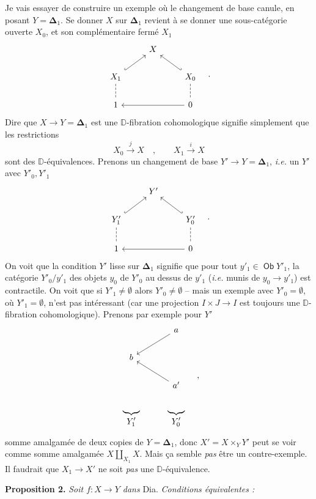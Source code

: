 \documentclass[11pt]{article}
\newcommand{\printedpage}[1]{\marginpar{\footnotesize p.~#1}}
\newcommand{\msp}[1]{\marginpar{\footnotesize [#1]}}
\newcommand{\D}{\mathbb{D}}
\newcommand{\Ob}{\mathop{\mathsf{Ob}}}
\newcommand{\Dia}{\textsf{Dia}}
\begin{document}
\hspace*{\parindent}Je vais essayer de construire un exemple où le changement de base canule, en posant $Y = \boldsymbol{\Delta}_1$. Se donner $X$ sur $\boldsymbol{\Delta}_1$ revient à se donner une sous-catégorie ouverte $X_0$, et son complémentaire fermé $X_1$
\[
\begin{tikzcd}
& X & \\
X_1 \arrow[ur, hook] \arrow[d, dash, dashed] & & X_0 \arrow[ul, hook'] \arrow[d, dash, dashed] \\
1 & & 0 \arrow[ll]
\end{tikzcd}
\quad .
\]
Dire que $X \to Y = \boldsymbol{\Delta}_1$ est une $\D$-fibration cohomologique signifie simplement
\msp{page 78}
que les restrictions
\[
X_0 \overset{j}{\longrightarrow} X \quad , \qquad X_1 \overset{i}{\longrightarrow} X
\]
sont des $\D$-équivalences. Prenons un changement de base $Y' \to Y = \boldsymbol{\Delta}_1$, \textit{i.e.} un $Y'$ avec $Y'_0, Y'_1$
\[
\begin{tikzcd}
& Y' & \\
Y'_1 \arrow[ur, hook] \arrow[d, dash, dashed] & & Y'_0 \arrow[ul, hook'] \arrow[d, dash, dashed] \\
1 & & 0 \arrow[ll]
\end{tikzcd}
\quad .
\]
On voit que la condition $Y'$ lisse sur $\boldsymbol{\Delta}_1$ signifie que pour tout $y'_1 \in \Ob Y'_1$, la catégorie $Y'_0/y'_1$ des objets $y_0$ de $Y'_0$ au dessus de $y'_1$ (\textit{i.e.} munis de $y_0 \to y'_1$) est contractile. On voit que si $Y'_1 \neq \emptyset$ alors $Y'_0 \neq \emptyset$ -- mais un exemple avec $Y'_0 = \emptyset$, où $Y'_1 = \emptyset$, n'est pas intéressant
\printedpage{48}
(car une projection $I \times J \to I$ est toujours une $\D$-fibration cohomologique). Prenons par exemple pour $Y'$
\[
\begin{tikzcd}
& a \arrow[dl] \\
b & \\
& a' \arrow[ul] \\
\underbrace{\qquad}_{\displaystyle Y'_1} & \underbrace{\qquad}_{\displaystyle Y'_0}
\end{tikzcd}
\quad ,
\]
somme amalgamée de deux copies de $Y = \boldsymbol{\Delta}_1$, donc $X' = X \times_Y Y'$ peut se voir comme somme amalgamée $X \amalg_{X_1} X$. Mais ça semble \textit{pas} être un contre-exemple. Il faudrait que $X_1 \to X'$ ne soit \textit{pas} une $\D$-équivalence.

\msp{page 79}

\textbf{Proposition 2.} \textit{Soit $f : X \to Y$ dans} \Dia. \textit{Conditions équivalentes :}
\end{document}
